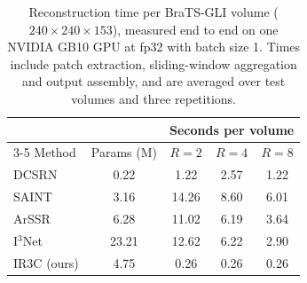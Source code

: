 \begin{table}[pos=t]
\caption{Reconstruction time per BraTS-GLI volume ($240\times240\times153$), measured end to end on one NVIDIA GB10 GPU at fp32 with batch size 1. Times include patch extraction, sliding-window aggregation and output assembly, and are averaged over test volumes and three repetitions.}
\label{tab:cost}
\footnotesize\setlength{\tabcolsep}{3pt}
\begin{tabular*}{\columnwidth}{@{\extracolsep{\fill}}lcccc@{}}
\toprule
& & \multicolumn{3}{c}{Seconds per volume} \\
\cmidrule(lr){3-5}
Method & Params (M) & $R=2$ & $R=4$ & $R=8$ \\
\midrule
DCSRN & 0.22 & 1.22 & 2.57 & 1.22 \\
SAINT & 3.16 & 14.26 & 8.60 & 6.01 \\
ArSSR & 6.28 & 11.02 & 6.19 & 3.64 \\
I$^3$Net & 23.21 & 12.62 & 6.22 & 2.90 \\
IR3C (ours) & 4.75 & 0.26 & 0.26 & 0.26 \\
\bottomrule
\end{tabular*}
\end{table}
